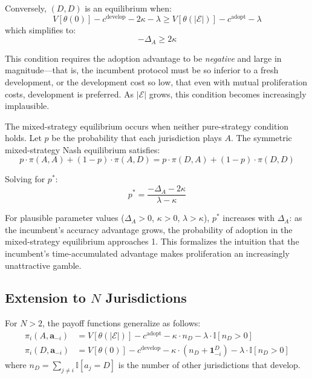 \documentclass[12pt,a4paper]{ctexart}
\theoremstyle{definition}
\theoremstyle{remark}
\begin{document}
Conversely, $(D, D)$ is an equilibrium when:
\begin{equation}
V[\theta(0)] - c^{\text{develop}} - 2\kappa - \lambda \geq V[\theta(|\mathcal{E}|)] - c^{\text{adopt}} - \lambda
\end{equation}
which simplifies to:
\begin{equation}
-\Delta_A \geq 2\kappa
\end{equation}

This condition requires the adoption advantage to be \textit{negative} and large in magnitude—that is, the incumbent protocol must be so inferior to a fresh development, or the development cost so low, that even with mutual proliferation costs, development is preferred. As $|\mathcal{E}|$ grows, this condition becomes increasingly implausible.

The mixed-strategy equilibrium occurs when neither pure-strategy condition holds. Let $p$ be the probability that each jurisdiction plays $A$. The symmetric mixed-strategy Nash equilibrium satisfies:
\begin{equation}
p \cdot \pi(A, A) + (1-p) \cdot \pi(A, D) = p \cdot \pi(D, A) + (1-p) \cdot \pi(D, D)
\end{equation}

Solving for $p^*$:
\begin{equation}
p^* = \frac{-\Delta_A - 2\kappa}{\lambda - \kappa}
\end{equation}

For plausible parameter values ($\Delta_A > 0$, $\kappa > 0$, $\lambda > \kappa$), $p^*$ increases with $\Delta_A$: as the incumbent's accuracy advantage grows, the probability of adoption in the mixed-strategy equilibrium approaches 1. This formalizes the intuition that the incumbent's time-accumulated advantage makes proliferation an increasingly unattractive gamble.

\subsection{Extension to $N$ Jurisdictions}

For $N > 2$, the payoff functions generalize as follows:
\begin{align}
\pi_i(A, \mathbf{a}_{-i}) &= V[\theta(|\mathcal{E}|)] - c^{\text{adopt}} - \kappa \cdot n_D - \lambda \cdot \mathbb{I}[n_D > 0] \\
\pi_i(D, \mathbf{a}_{-i}) &= V[\theta(0)] - c^{\text{develop}} - \kappa \cdot (n_D + \mathbf{1}_{-i}^D) - \lambda \cdot \mathbb{I}[n_D > 0]
\end{align}
where $n_D = \sum_{j \neq i} \mathbb{I}[a_j = D]$ is the number of other jurisdictions that develop.
\end{document}
